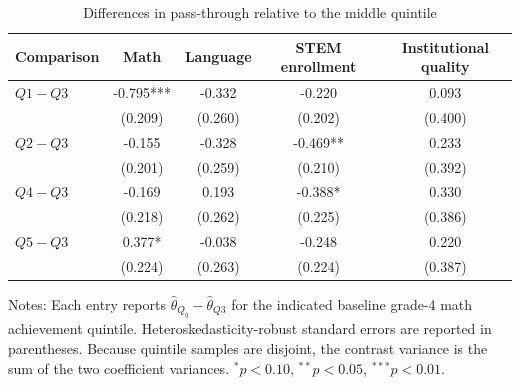 \begin{table}[!htbp]
\centering
\begin{threeparttable}
\caption{Differences in pass-through relative to the middle quintile}
\label{tab:simce4-math-quintile-contrasts-q3}
\small
\begin{tabular}{lcccc}
\toprule
Comparison & Math & Language & STEM enrollment & Institutional quality \\
\midrule
$Q1-Q3$ & -0.795*** & -0.332 & -0.220 & 0.093 \\
 & (0.209) & (0.260) & (0.202) & (0.400) \\
$Q2-Q3$ & -0.155 & -0.328 & -0.469** & 0.233 \\
 & (0.201) & (0.259) & (0.210) & (0.392) \\
$Q4-Q3$ & -0.169 & 0.193 & -0.388* & 0.330 \\
 & (0.218) & (0.262) & (0.225) & (0.386) \\
$Q5-Q3$ & 0.377* & -0.038 & -0.248 & 0.220 \\
 & (0.224) & (0.263) & (0.224) & (0.387) \\
\bottomrule
\end{tabular}
\begin{tablenotes}[flushleft]
\footnotesize
\item Notes: Each entry reports $\widehat{\theta}_{Q_q} - \widehat{\theta}_{Q3}$ for the indicated baseline grade-4 math achievement quintile. Heteroskedasticity-robust standard errors are reported in parentheses. Because quintile samples are disjoint, the contrast variance is the sum of the two coefficient variances. $^{*}p<0.10$, $^{**}p<0.05$, $^{***}p<0.01$.
\end{tablenotes}
\end{threeparttable}
\end{table}
